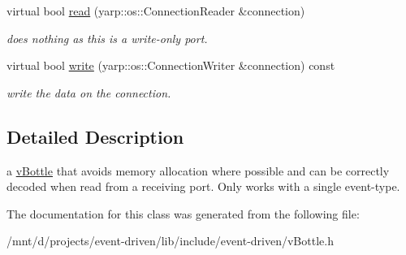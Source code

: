 \begin{DoxyCompactItemize}
\mbox{\label{classev_1_1vBottleMimic_a5c7ead7b0484b9abe99e922196c074ff}} 
virtual bool \hyperlink{classev_1_1vBottleMimic_a5c7ead7b0484b9abe99e922196c074ff}{read} (yarp\+::os\+::\+Connection\+Reader \&connection)
\begin{DoxyCompactList}\small\item\em does nothing as this is a write-\/only port. \end{DoxyCompactList}\item 
\mbox{\label{classev_1_1vBottleMimic_a70d7add0350d3254f6867a3dd7f6c50b}} 
virtual bool \hyperlink{classev_1_1vBottleMimic_a70d7add0350d3254f6867a3dd7f6c50b}{write} (yarp\+::os\+::\+Connection\+Writer \&connection) const
\begin{DoxyCompactList}\small\item\em write the data on the connection. \end{DoxyCompactList}\end{DoxyCompactItemize}


\subsection{Detailed Description}
a \hyperlink{classev_1_1vBottle}{v\+Bottle} that avoids memory allocation where possible and can be correctly decoded when read from a receiving port. Only works with a single event-\/type. 

The documentation for this class was generated from the following file\+:\begin{DoxyCompactItemize}
\item 
/mnt/d/projects/event-\/driven/lib/include/event-\/driven/v\+Bottle.\+h\end{DoxyCompactItemize}
